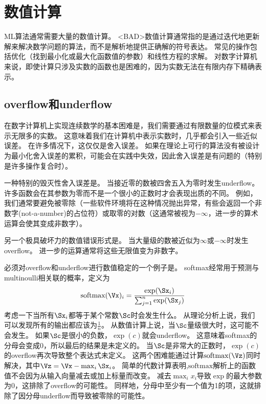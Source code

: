 \chapter{数值计算}
\label{chap:numerical_computation}

\gls{ML}算法通常需要大量的数值计算。
<BAD>数值计算通常指的是通过迭代地更新解来解决数学问题的算法，而不是解析地提供正确解的符号表达。
常见的操作包括优化（找到最小化或最大化函数值的参数）和线性方程的求解。
对数字计算机来说，即使计算只涉及实数的函数也是困难的，因为实数无法在有限内存下精确表示。

\section{\gls{overflow}和\gls{underflow}}
\label{sec:overflow_and_underflow}
在数字计算机上实现连续数学的基本困难是，我们需要通过有限数量的位模式来表示无限多的实数。
这意味着我们在计算机中表示实数时，几乎都会引入一些近似误差。
在许多情况下，这仅仅是舍入误差。
如果在理论上可行的算法没有被设计为最小化舍入误差的累积，可能会在实践中失效，因此舍入误差是有问题的（特别是许多操作复合时）。

一种特别的毁灭性舍入误差是。
当接近零的数被四舍五入为零时发生\gls{underflow}。
许多函数会在其参数为零而不是一个很小的正数时才会表现出质的不同。
例如，我们通常要避免被零除（一些软件环境将在这种情况抛出异常，有些会返回一个非数字(not-a-number)的占位符）或取零的对数（这通常被视为$-\infty$，进一步的算术运算会使其变成非数字）。


另一个极具破坏力的数值错误形式是。
当大量级的数被近似为$\infty$或$-\infty$时发生\gls{overflow}。
进一步的运算通常将这些无限值变为非数字。

必须对\gls{overflow}和\gls{underflow}进行数值稳定的一个例子是。
\gls{softmax}经常用于预测与\gls{multinoulli}相关联的概率，定义为
\begin{align}
 \text{softmax}(\Vx)_i = \frac{\exp(\Sx_i)}{\sum_{j=1}^n \exp(\Sx_j)}
\end{align}
考虑一下当所有$\Sx_i$都等于某个常数$\Sc$时会发生什么。
从理论分析上说，我们可以发现所有的输出都应该为$\frac{1}{n}$。
从数值计算上说，当$\Sc$量级很大时，这可能不会发生。
如果$\Sc$是很小的负数，$\exp(c)$就会\gls{underflow}。
这意味着\gls{softmax}的分母会变成0，所以最后的结果是未定义的。
当$\Sc$是非常大的正数时，$\exp(c)$的\gls{overflow}再次导致整个表达式未定义。
这两个困难能通过计算$\text{softmax}(\Vz)$同时解决，其中$\Vz = \Vx - \max_i \Sx_i$。
简单的代数计算表明,$\text{softmax}$解析上的函数值不会因为从输入向量减去或加上标量而改变。
减去$\max_i x_i$导致$\exp$的最大参数为$0$，这排除了\gls{overflow}的可能性。
同样地，分母中至少有一个值为1的项，这就排除了因分母\gls{underflow}而导致被零除的可能性。


